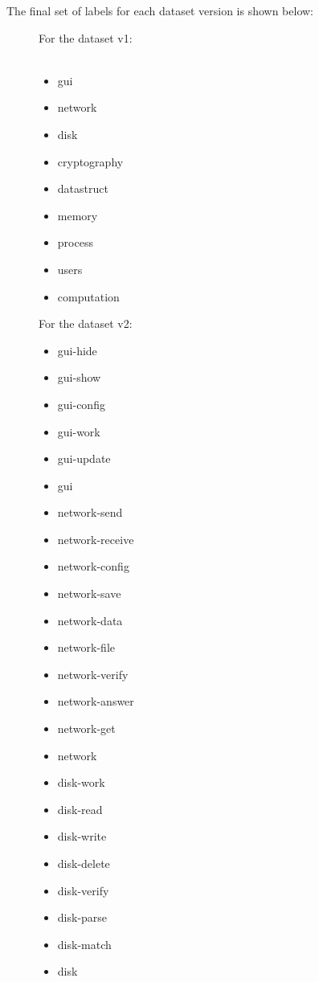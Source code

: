 \begin{appendices}
The final set of labels for each dataset version is shown below:

\begin{figure}[H]
%
    For the dataset v1:\\\\
   {\footnotesize
\begin{itemize}
	\item gui
	\item network
	\item disk
	\item cryptography
	\item datastruct
	\item memory
	\item process
	\item users
	\item computation
\end{itemize}
}
\endminipage
{}%
  
  For the dataset v2:\\

  {\footnotesize
  \begin{itemize} 
    \item gui-hide
    \item gui-show
    \item gui-config
    \item gui-work
    \item gui-update
    \item gui
    \item network-send
    \item network-receive
    \item network-config
    \item network-save
    \item network-data
    \item network-file
    \item network-verify
    \item network-answer
    \item network-get
    \item network
    \end{itemize}
   }
   \endminipage
   {\footnotesize
   \begin{itemize} 
    \item disk-work
    \item disk-read
    \item disk-write
    \item disk-delete
    \item disk-verify
    \item disk-parse
    \item disk-match
    \item disk


\end{itemize}}
\end{figure}
\end{appendices}
